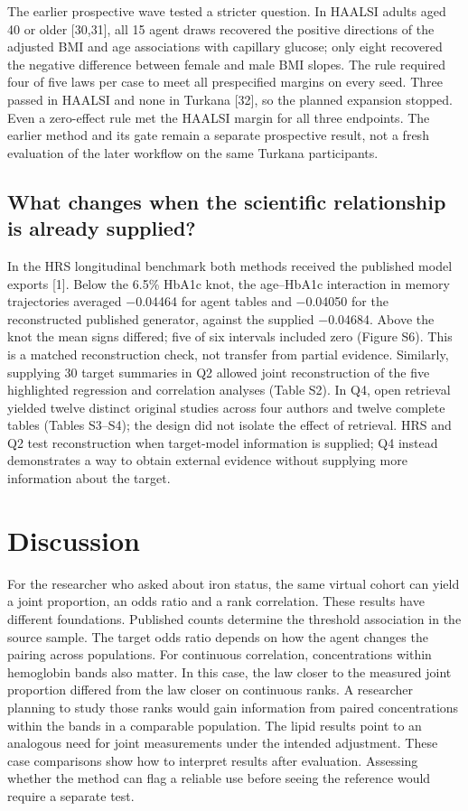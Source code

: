 \documentclass[11pt,letterpaper]{article}
\begin{document}
The earlier prospective wave tested a stricter question. In HAALSI adults aged 40 or older [30,31], all 15 agent draws recovered the positive directions of the adjusted BMI and age associations with capillary glucose; only eight recovered the negative difference between female and male BMI slopes. The rule required four of five laws per case to meet all prespecified margins on every seed. Three passed in HAALSI and none in Turkana [32], so the planned expansion stopped. Even a zero-effect rule met the HAALSI margin for all three endpoints. The earlier method and its gate remain a separate prospective result, not a fresh evaluation of the later workflow on the same Turkana participants.


\subsection{What changes when the scientific relationship is already supplied?}

In the HRS longitudinal benchmark both methods received the published model exports [1]. Below the 6.5\% HbA1c knot, the age–\allowbreak{}HbA1c interaction in memory trajectories averaged −0.04464 for agent tables and −0.04050 for the reconstructed published generator, against the supplied −0.04684. Above the knot the mean signs differed; five of six intervals included zero (Figure S6). This is a matched reconstruction check, not transfer from partial evidence. Similarly, supplying 30 target summaries in Q2 allowed joint reconstruction of the five highlighted regression and correlation analyses (Table S2). In Q4, open retrieval yielded twelve distinct original studies across four authors and twelve complete tables (Tables S3–\allowbreak{}S4); the design did not isolate the effect of retrieval. HRS and Q2 test reconstruction when target-model information is supplied; Q4 instead demonstrates a way to obtain external evidence without supplying more information about the target.


\section{Discussion}

For the researcher who asked about iron status, the same virtual cohort can yield a joint proportion, an odds ratio and a rank correlation. These results have different foundations. Published counts determine the threshold association in the source sample. The target odds ratio depends on how the agent changes the pairing across populations. For continuous correlation, concentrations within hemoglobin bands also matter. In this case, the law closer to the measured joint proportion differed from the law closer on continuous ranks. A researcher planning to study those ranks would gain information from paired concentrations within the bands in a comparable population. The lipid results point to an analogous need for joint measurements under the intended adjustment. These case comparisons show how to interpret results after evaluation. Assessing whether the method can flag a reliable use before seeing the reference would require a separate test.
\end{document}
